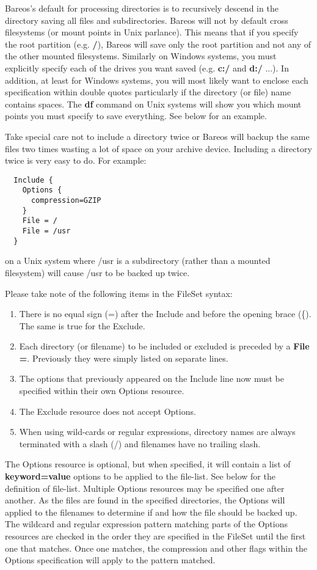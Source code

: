 Bareos's default for processing directories is to recursively descend in
the directory saving all files and subdirectories.  Bareos will not by
default cross filesystems (or mount points in Unix parlance).  This means
that if you specify the root partition (e.g.  {\bf /}), Bareos will save
only the root partition and not any of the other mounted filesystems.
Similarly on Windows systems, you must explicitly specify each of the
drives you want saved (e.g.
{\bf c:/} and {\bf d:/} ...). In addition, at least for Windows systems, you
will most likely want to enclose each specification within double quotes
particularly if the directory (or file) name contains spaces. The {\bf df}
command on Unix systems will show you which mount points you must specify to
save everything. See below for an example.

Take special care not to include a directory twice or Bareos will backup
the same files two times wasting a lot of space on your archive device.
Including a directory twice is very easy to do.  For example:

\footnotesize
\begin{verbatim}
  Include {
    Options {
      compression=GZIP
    }
    File = /
    File = /usr
  }
\end{verbatim}
\normalsize

on a Unix system where /usr is a subdirectory (rather than a mounted
filesystem) will cause /usr to be backed up twice.

Please take note of the following items in the FileSet syntax:

\begin{enumerate}
\item There is no equal sign (=) after the Include and before the opening
   brace (\{). The same is true for the Exclude.
\item Each directory (or filename) to be included or excluded is preceded by a {\bf File
   =}.  Previously they were simply listed on separate lines.
\item The options that previously appeared on the Include line now must be
   specified within their own Options resource.
\item The Exclude resource does not accept Options.
\item When using wild-cards or regular expressions, directory names are
   always terminated with a slash (/) and filenames have no trailing slash.
\end{enumerate}

The Options resource is optional, but when specified, it will contain a
list of {\bf keyword=value} options to be applied to the file-list.
See below for the definition of file-list.
Multiple Options resources may be specified one after another.  As the
files are found in the specified directories, the Options will applied to
the filenames to determine if and how the file should be backed up.  The
wildcard and regular expression pattern matching parts of the
Options resources are checked in the order they are specified in the
FileSet until the first one that matches. Once one matches, the
compression and other flags within the Options specification will
apply to the pattern matched.


